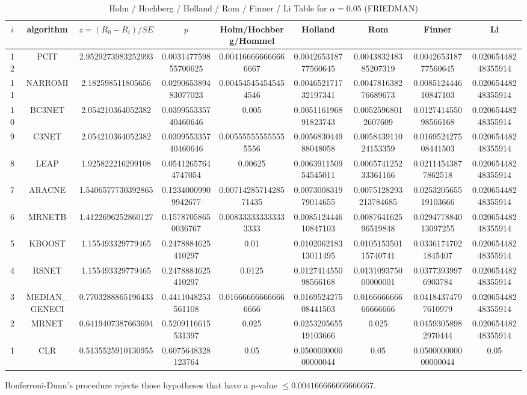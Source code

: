 \documentclass[a4paper,10pt]{article}
\begin{document}
\begin{landscape}
\newpage

\begin{table}[!htp]
\centering\scriptsize
\caption{Holm / Hochberg / Holland / Rom / Finner / Li Table for $\alpha=0.05$ (FRIEDMAN)}
\begin{tabular}{ccccccccc}
$i$&algorithm&$z=(R_0 - R_i)/SE$&$p$&Holm/Hochberg/Hommel&Holland&Rom&Finner&Li\\
\hline
12&PCIT&2.9529273983252993&0.003147759855700625&0.004166666666666667&0.004265318777560645&0.004383248385207319&0.004265318777560645&0.02065448248355914\\
11&NARROMI&2.182598511805656&0.029065389483077023&0.004545454545454546&0.004652171732197341&0.004781638276689673&0.008512444610847103&0.02065448248355914\\
10&BC3NET&2.054210364052382&0.039955335740460646&0.005&0.005116196891823743&0.00525968012607609&0.012741455098566168&0.02065448248355914\\
9&C3NET&2.054210364052382&0.039955335740460646&0.005555555555555556&0.005683044988048058&0.005843911024153359&0.016952427508441503&0.02065448248355914\\
8&LEAP&1.925822216299108&0.05412657644747054&0.00625&0.006391150954545011&0.006574125233361166&0.02114543877862518&0.02065448248355914\\
7&ARACNE&1.5406577730392865&0.12340009909942677&0.0071428571428571435&0.007300831979014655&0.0075128293213784685&0.025320565519103666&0.02065448248355914\\
6&MRNETB&1.4122696252860127&0.15787058650036767&0.008333333333333333&0.008512444610847103&0.008764162596519848&0.029477884013097255&0.02065448248355914\\
5&KBOOST&1.155493329779465&0.2478884625410297&0.01&0.010206218313011495&0.010515350115740741&0.03361747021845407&0.02065448248355914\\
4&RSNET&1.155493329779465&0.2478884625410297&0.0125&0.012741455098566168&0.013109375000000001&0.03773939976903784&0.02065448248355914\\
3&MEDIAN_GENECI&0.7703288865196433&0.4411048253561108&0.016666666666666666&0.016952427508441503&0.016666666666666666&0.04184374797610979&0.02065448248355914\\
2&MRNET&0.6419407387663694&0.5209116615531397&0.025&0.025320565519103666&0.025&0.04593058982970444&0.02065448248355914\\
1&CLR&0.5135525910130955&0.6075648328123764&0.05&0.050000000000000044&0.05&0.050000000000000044&0.05\\
\hline
\end{tabular}
\end{table}
Bonferroni-Dunn's procedure rejects those hypotheses that have a p-value $\le0.004166666666666667$.



\end{landscape}
\end{document}
